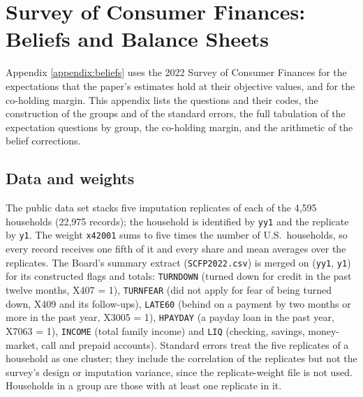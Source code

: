 \section{Survey of Consumer Finances: Beliefs and Balance Sheets}\label{appendix:scf}

Appendix \ref{appendix:beliefs} uses the 2022 Survey of Consumer Finances for the expectations that the paper's estimates hold at their objective values, and for the co-holding margin. This appendix lists the questions and their codes, the construction of the groups and of the standard errors, the full tabulation of the expectation questions by group, the co-holding margin, and the arithmetic of the belief corrections.

\subsection{Data and weights}

The public data set stacks five imputation replicates of each of the 4,595 households (22,975 records); the household is identified by \texttt{yy1} and the replicate by \texttt{y1}. The weight \texttt{x42001} sums to five times the number of U.S.\ households, so every record receives one fifth of it and every share and mean averages over the replicates. The Board's summary extract (\texttt{SCFP2022.csv}) is merged on (\texttt{yy1}, \texttt{y1}) for its constructed flags and totals: \texttt{TURNDOWN} (turned down for credit in the past twelve months, X407 = 1), \texttt{TURNFEAR} (did not apply for fear of being turned down, X409 and its follow-ups), \texttt{LATE60} (behind on a payment by two months or more in the past year, X3005 = 1), \texttt{HPAYDAY} (a payday loan in the past year, X7063 = 1), \texttt{INCOME} (total family income) and \texttt{LIQ} (checking, savings, money-market, call and prepaid accounts). Standard errors treat the five replicates of a household as one cluster; they include the correlation of the replicates but not the survey's design or imputation variance, since the replicate-weight file is not used. Households in a group are those with at least one replicate in it.

